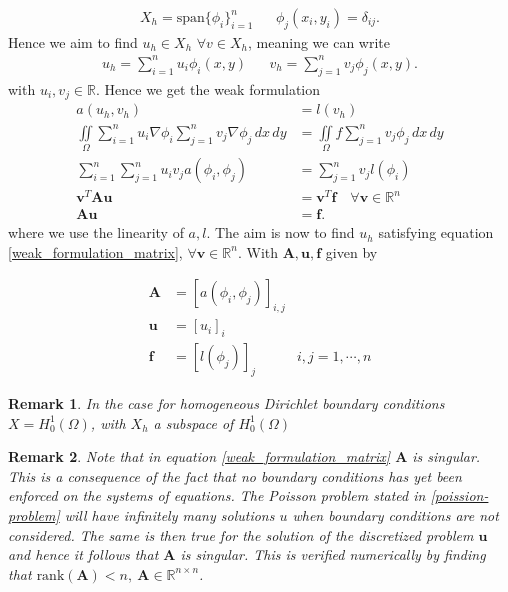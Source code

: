 \documentclass[5pt,a4paper,english]{elsarticle}%
\newtheorem*{remark}{Remark}
\begin{document}
\begin{equation*}
    \begin{aligned}
X_h = \text{span} \{\phi_i\}_{i=1}^n & & \phi_j(x_i,y_i) = \delta_{ij}.
    \end{aligned}
\end{equation*}
Hence we aim to find $u_h \in X_h$ $\forall v \in X_h$, meaning we can write
\begin{equation*}
    \begin{aligned}
u_h = \sum_{i=1}^n u_i \phi_i(x,y) & & v_h = \sum_{j=1}^n v_j \phi_j(x,y).
    \end{aligned}
\end{equation*}
\noindent with $u_i,v_j \in \mathbb{R}$. Hence we get the weak formulation
\begin{equation}
\begin{aligned}
a(u_h,v_h) &= l(v_h) 
\\
\iint\limits_{\Omega} 
\sum_{i=1}^n u_i \nabla \phi_i \sum_{j=1}^n v_j \nabla\phi_j \, dx \, dy 
&= \iint\limits_{\Omega} f \sum_{j=1}^n v_j \phi_j \, dx \, dy
\\
\sum_{i=1}^n\sum_{j=1}^n u_i v_j a(\phi_i,\phi_j) &= \sum_{j=1}^n v_j l(\phi_i)
\\
\bm v^T\bm A \bm u &= \bm v^T \bm f \quad \forall \bm v \in \mathbb R^n
\\ \bm A \bm u &= \bm f.
\label{weak_formulation_matrix}
\end{aligned}
\end{equation}
where we use the linearity of $a,l$. 
The aim is now to find $u_h$ satisfying equation \eqref{weak_formulation_matrix}, $\forall \bm v \in \mathbb R^n$.
With $\bm A, \bm u, \bm f$ given by

\begin{equation}
    \begin{aligned}
\bm A &= [a(\phi_i,\phi_j)]_{i,j}
\\ 
\bm u &= [u_i]_i
\\
\bm f &= [l(\phi_j)]_j & i,j = 1,\cdots,n
\end{aligned}
\end{equation}
\begin{remark}
    In the case for homogeneous Dirichlet boundary conditions $X = H_0^1(\Omega)$, with $X_h$ a subspace of $H_0^1(\Omega)$ 
\end{remark}
\begin{remark}
Note that in equation \eqref{weak_formulation_matrix} $\bm A$ is singular. 
This is a consequence of the fact that no boundary conditions has yet been enforced on the systems of equations.
The Poisson problem stated in \eqref{poission-problem} will have infinitely many solutions $u$ when boundary conditions are not considered.
The same is then true for the solution of the discretized problem $\bm u$ and hence it follows that $\bm A$ is singular.
This is verified numerically by finding that $\textrm{rank}(\bm A) < n, \ \bm A \in \mathbb{R}^{n \times n}$.
\end{remark}
\end{document}
